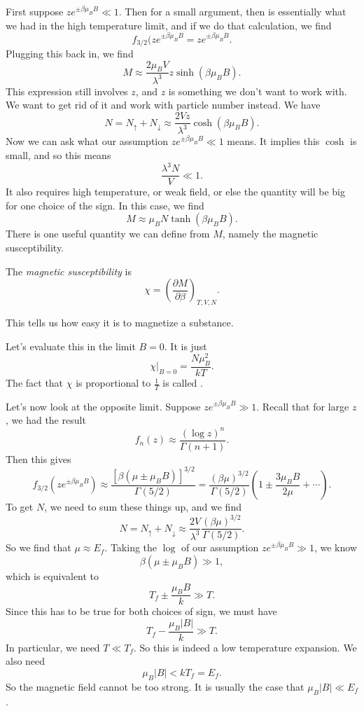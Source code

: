 \documentclass[a4paper]{article}
\begin{document}
First suppose $ze^{\pm \beta \mu_BB} \ll 1$. Then for a small argument, then is essentially what we had in the high temperature limit, and if we do that calculation, we find
\[
  f_{3/2}(z e^{\pm \beta\mu_BB} = z e^{\pm \beta\mu_BB}.
\]
Plugging this back in, we find
\[
  M \approx \frac{2 \mu_B V}{\lambda^3} z \sinh (\beta \mu_B B).
\]
This expression still involves $z$, and $z$ is something we don't want to work with. We want to get rid of it and work with particle number instead. We have
\[
  N = N_\uparrow + N_\downarrow \approx \frac{2 V z}{\lambda^3} \cosh (\beta \mu_BB).
\]
Now we can ask what our assumption $z e^{\pm \beta \mu_BB} \ll 1$ means. It implies this $\cosh$ is small, and so this means
\[
  \frac{\lambda^3 N}{V} \ll 1.
\]
It also requires high temperature, or weak field, or else the quantity will be big for one choice of the sign. In this case, we find
\[
  M \approx \mu_B N \tanh (\beta \mu_B B).
\]
There is one useful quantity we can define from $M$, namely the magnetic susceptibility.
\begin{defi}
  The \emph{magnetic susceptibility} is
  \[
    \chi = \left(\frac{\partial M}{\partial \beta}\right)_{T, V, N}.
  \]
\end{defi}
This tells us how easy it is to magnetize a substance.

Let's evaluate this in the limit $B = 0$. It is just
\[
  \chi|_{B = 0} = \frac{N \mu_B^2}{kT}.
\]
The fact that $\chi$ is proportional to $\frac{1}{T}$ is called .

Let's now look at the opposite limit. Suppose $z e^{\pm \beta \mu_B B} \gg 1$. Recall that for large $z$, we had the result
\[
  f_n(z) \approx \frac{(\log z)^n}{\Gamma(n + 1)}.
\]
Then this gives
\[
  f_{3/2} (ze^{\pm \beta \mu_BB}) \approx \frac{[\beta(\mu \pm \mu_BB)]^{3/2}}{\Gamma(5/2)} = \frac{(\beta \mu)^{3/2}}{\Gamma(5/2)} ( 1 \pm \frac{3 \mu_BB}{2\mu} + \cdots).
\]
To get $N$, we need to sum these things up, and we find
\[
  N = N_{\uparrow} + N_{\downarrow} \approx \frac{2V}{\lambda^3} \frac{(\beta \mu)^{3/2}}{\Gamma(5/2)}.
\]
So we find that $\mu \approx E_f$. Taking the $\log$ of our assumption $ze^{\pm \beta\mu_BB} \gg 1$, we know
\[
  \beta(\mu \pm \mu_BB) \gg 1,
\]
which is equivalent to
\[
  T_f \pm \frac{\mu_BB}{k} \gg T.
\]
Since this has to be true for both choices of sign, we must have
\[
  T_f - \frac{\mu_B|B|}{k} \gg T.
\]
In particular, we need $T \ll T_f$. So this is indeed a low temperature expansion. We also need
\[
  \mu_B|B| < k T_f = E_f.
\]
So the magnetic field cannot be too strong. It is usually the case that $\mu_B|B| \ll E_f$.
\end{document}
